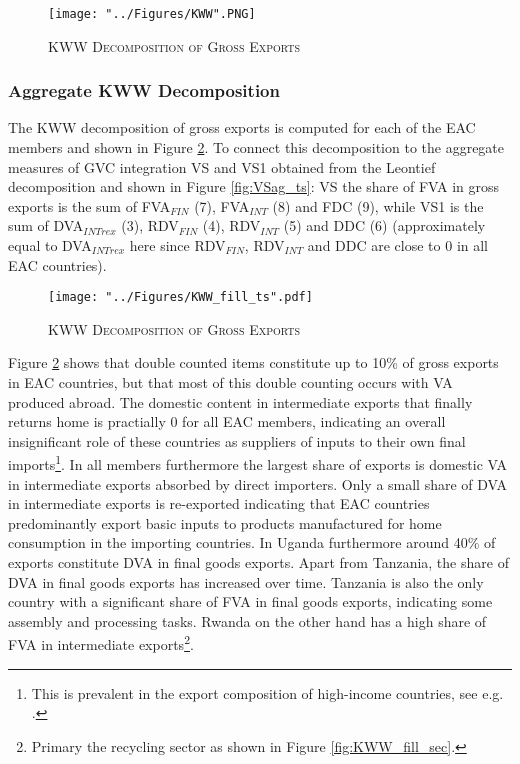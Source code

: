 \documentclass[a4paper]{article}
\begin{document}
\begin{figure}[h!]
\centering
\caption{\label{fig:KWW}\textsc{KWW Decomposition of Gross Exports}}
\texttt{[image: "../Figures/KWW".PNG]} %
\end{figure}
\FloatBarrier

\subsubsection{Aggregate KWW Decomposition}
The KWW decomposition of gross exports is computed for each of the EAC members and shown in Figure \ref{fig:KWW_fill_ts}. To connect this decomposition to the aggregate measures of GVC integration VS and VS1 obtained from the Leontief decomposition and shown in Figure \ref{fig:VSag_ts}: VS the share of FVA in gross exports is the sum of FVA$_{FIN}$ (7), FVA$_{INT}$ (8) and FDC (9), while VS1 is the sum of DVA$_{INTrex}$ (3), RDV$_{FIN}$ (4), RDV$_{INT}$ (5) and DDC (6) (approximately equal to DVA$_{INTrex}$ here since RDV$_{FIN}$, RDV$_{INT}$  and DDC are close to 0 in all EAC countries).  

\begin{figure}[h!]
\centering
\caption{\label{fig:KWW_fill_ts}\textsc{KWW Decomposition of Gross Exports}}
\texttt{[image: "../Figures/KWW\_fill\_ts".pdf]} %
\end{figure}
\FloatBarrier

Figure \ref{fig:KWW_fill_ts} shows that double counted items constitute up to 10\% of gross exports in EAC countries, but that most of this double counting occurs with VA produced abroad. The domestic content in intermediate exports that finally returns home is practially 0 for all EAC members, indicating an overall insignificant role of these countries as suppliers of inputs to their own final imports\footnote{This is prevalent in the export composition of high-income countries, see e.g. \citep{Kummritz20162}.}. In all members furthermore the largest share of exports is domestic VA in intermediate exports absorbed by direct importers. Only a small share of DVA in intermediate exports is re-exported indicating that EAC countries predominantly export basic inputs to products manufactured for home consumption in the importing countries. In Uganda furthermore around 40\% of exports constitute DVA in final goods exports. Apart from Tanzania, the share of DVA in final goods exports has increased over time. Tanzania is also the only country with a significant share of FVA in final goods exports, indicating some assembly and processing tasks. Rwanda on the other hand has a high share of FVA in intermediate exports\footnote{Primary the recycling sector as shown in Figure \ref{fig:KWW_fill_sec}.}. \newline  %
\end{document}
